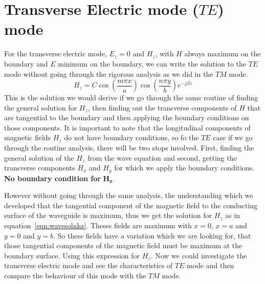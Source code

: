 \section{Transverse Electric mode ($TE$) mode}
For the transverse electric mode, $E_{z} = 0$ and $H_{z}$, with $H$ always maximum on the boundary and $E$ minimum on the boundary, we can write the solution to the $TE$ mode without going through the rigorous analysis as we did in the $TM$ mode.
\begin{equation}
H_z = C\cos\left(\frac{m\pi x}{a}\right) \cos\left(\frac{n\pi y}{b}\right)e^{-j\beta z}
\label{eqn:wavesolnhz}
\end{equation}
This is the solution we would derive if we go through the same routine of finding the general solution for $H_z$, then finding out the transverse components of $H$ that are tangential to the boundary and then applying the boundary conditions on those components. It is important to note that the longitudinal components of magnetic fields $H_z$ do not have boundary conditions, so fo the $TE$ case if we go through the routine analysis, there will be two stops involved. First, finding the general solution of the $H_z$ from the wave equation and second, getting the transverse components $H_x$ and $H_y$ for which we apply the boundary conditions. \textbf{No boundary condition for} $\boldsymbol{H_z}$.

However without going through the same analysis, the understanding which we developed that the tangential component of the magnetic field to the conducting surface of the waveguide is maximum, thus we get the solution for $H_z$ as in equation~\ref{eqn:wavesolnhz}. Theses fields are maximum with $x=0$, $x=a$ and $y=0$ and $y=b$. So these fields have a variation which we are looking for, that those tangential components of the magnetic field must be maximum at the boundary surface. Using this expression for $H_z$. Now we could investigate the transverse electric mode and see the characteristics of $TE$ mode and then compare the behaviour of this mode with the $TM$ mode.